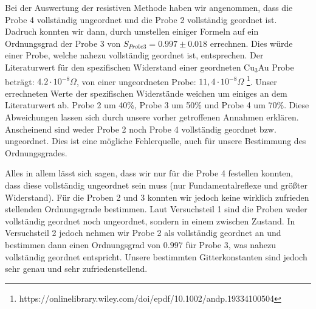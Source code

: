     Bei der Auswertung der resistiven Methode haben wir angenommen, dass die Probe 4 vollständig
    ungeordnet und die Probe 2 vollständig geordnet ist. Dadruch konnten wir dann, durch umstellen einiger Formeln
    auf ein Ordnungsgrad der Probe 3 von $S_{Probe 3} = 0.997 \pm 0.018$ errechnen. 
    Dies würde einer Probe, welche nahezu vollständig geordnet ist, entsprechen. 
    Der Literaturwert für den spezifischen Widerstand einer geordneten Cu$_3$Au Probe beträgt: $4.2 \cdot 10^{-8}\Omega$, von einer ungeordneten
    Probe: $11,4\cdot 10^{-8}\Omega$ \footnote{https://onlinelibrary.wiley.com/doi/epdf/10.1002/andp.19334100504}.
    Unser errechneten Werte der spezifischen Widerstände weichen um einiges an dem Literaturwert ab.
    Probe 2 um 40\%, Probe 3 um 50\% und Probe 4 um 70\%. Diese Abweichungen lassen sich durch 
    unsere vorher getroffenen Annahmen erklären. Anscheinend sind weder Probe 2 noch Probe 4 vollständig geordnet bzw. ungeordnet.
    Dies ist eine mögliche Fehlerquelle, auch für unsere Bestimmung des Ordnungsgrades.
    
    Alles in allem lässt sich sagen, dass wir nur für die Probe 4 festellen konnten, dass diese vollständig ungeordnet sein muss
    (nur Fundamentalreflexe und größter Widerstand). Für die Proben 2 und 3 konnten wir jedoch keine wirklich zufrieden stellenden
    Ordnungsgrade bestimmen. Laut Versuchsteil 1 sind die Proben weder vollständig geordnet noch ungeordnet, sondern in einem
    zwischen Zustand. In Versuchsteil 2 jedoch nehmen wir Probe 2 als vollständig geordnet an und bestimmen
    dann einen Ordnungsgrad von $0.997$ für Probe 3, was nahezu vollständig geordnet entspricht. 
    Unsere bestimmten Gitterkonstanten sind jedoch sehr genau und sehr zufriedenstellend.